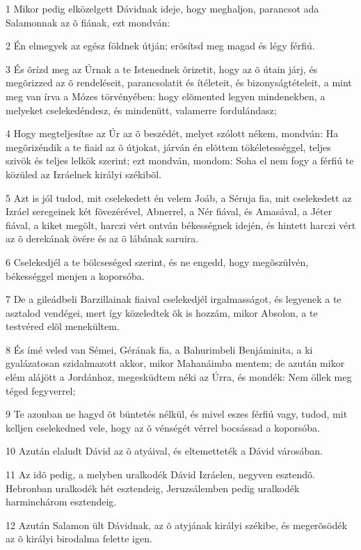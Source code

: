 \par 1 Mikor pedig elközelgett Dávidnak ideje, hogy meghaljon, parancsot ada Salamonnak az õ fiának, ezt mondván:
\par 2 Én elmegyek az egész földnek útján; erõsítsd meg magad és légy férfiú.
\par 3 És õrízd meg az Úrnak a te Istenednek õrizetit, hogy az õ útain járj, és megõrizzed az õ rendeléseit, parancsolatit és ítéleteit, és bizonyságtételeit, a mint meg van írva a Mózes törvényében: hogy elõmented legyen mindenekben, a melyeket cselekedéndesz, és mindenütt, valamerre fordulándasz;
\par 4 Hogy megteljesítse az Úr az õ beszédét, melyet szólott nékem, mondván: Ha megõrizéndik a te fiaid az õ útjokat, járván én elõttem tökéletességgel, teljes szivök és teljes lelkök szerint; ezt mondván, mondom: Soha el nem fogy a férfiú te közüled az Izráelnek királyi székibõl.
\par 5 Azt is jól tudod, mit cselekedett én velem Joáb, a Séruja fia, mit cselekedett az Izráel seregeinek két fõvezérével, Abnerrel, a Nér fiával, és Amasával,  a Jéter fiával, a kiket megölt, harczi vért ontván békességnek idején, és hintett harczi vért az õ derekának övére és az õ lábának saruira.
\par 6 Cselekedjél a te bölcseséged szerint, és ne engedd, hogy megõszülvén, békességgel menjen a koporsóba.
\par 7 De a gileádbeli Barzillainak fiaival cselekedjél irgalmasságot, és legyenek a te asztalod vendégei, mert így közeledtek õk is hozzám, mikor Absolon, a te testvéred elõl menekültem.
\par 8 És ímé veled van Sémei, Gérának fia, a Bahurimbeli Benjáminita, a ki gyalázatosan szidalmazott akkor, mikor Mahanáimba mentem; de azután mikor elém alájött a Jordánhoz, megesküdtem  néki az Úrra, és mondék: Nem öllek meg téged fegyverrel;
\par 9 Te azonban ne hagyd õt büntetés nélkül, és mivel eszes férfiú vagy, tudod, mit kelljen cselekedned vele, hogy az õ vénségét vérrel bocsássad a koporsóba.
\par 10 Azután elaludt Dávid az õ atyáival, és eltemetteték a Dávid városában.
\par 11 Az idõ pedig, a melyben uralkodék Dávid Izráelen, negyven esztendõ. Hebronban uralkodék hét esztendeig, Jeruzsálemben pedig uralkodék harminchárom esztendeig.
\par 12 Azután Salamon ült Dávidnak, az õ atyjának királyi székibe, és megerõsödék az õ királyi birodalma felette igen.
